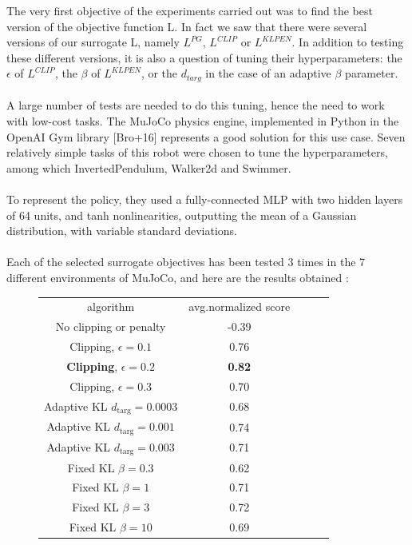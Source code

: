 \documentclass{article}
\begin{document}
The very first objective of the experiments carried out was to find the best version of the objective function L. In fact we saw that there were several versions of our surrogate L, namely $L^{PG}$, $L^{CLIP}$ or $L^{KLPEN}$. In addition to testing these different versions, it is also a question of tuning their hyperparameters: the $\epsilon$ of $L^{CLIP}$, the $\beta$ of  $L^{KLPEN}$, or the $d_{targ}$ in the case of an adaptive $\beta$ parameter.
\\ \\
A large number of tests are needed to do this tuning, hence the need to work with low-cost tasks. 
The MuJoCo physics engine, implemented in Python in the OpenAI Gym library [Bro+16] represents a good solution for this use case. Seven relatively simple tasks of this robot were chosen to tune the hyperparameters, among which InvertedPendulum, Walker2d and Swimmer. 
\\ \\
To represent the policy, they used a fully-connected MLP with two hidden layers of 64 units, and tanh nonlinearities, outputting the mean of a Gaussian distribution, with variable standard deviations.
\\ \\ 
Each of the selected surrogate objectives has been tested 3 times in the 7 different environments of MuJoCo, and here are the results obtained :

\begin{figure}[!h]
    \centering
        \begin{tabular}{ c|c c c c } 
         \hline
         algorithm & avg.normalized score\\ 
         No clipping or penalty & -0.39\\ 
         Clipping, $\epsilon = 0.1$ & 0.76\\
         \textbf{Clipping}, $\epsilon=0.2$& \textbf{0.82}\\
         Clipping, $\epsilon = 0.3$ & 0.70\\
         Adaptive KL $d_{\text{targ}} = 0.0003$& 0.68\\
         Adaptive KL $d_{\text{targ}} = 0.001$& 0.74\\
         Adaptive KL $d_{\text{targ}} = 0.003$& 0.71\\
         Fixed KL $\beta = 0.3$ & 0.62\\
         Fixed KL $\beta = 1$ & 0.71\\
         Fixed KL $\beta = 3$ & 0.72\\
         Fixed KL $\beta = 10$ & 0.69\\
         \hline
        \end{tabular}
\end{figure}
\end{document}
